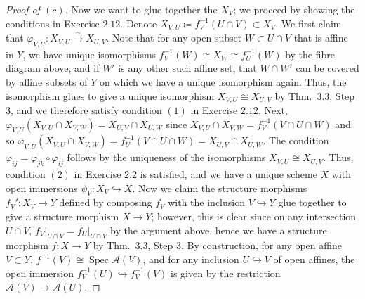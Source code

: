 \documentclass[10pt]{article}
\theoremstyle{definition}
\theoremstyle{remark}
\numberwithin{equation}{section}
\numberwithin{figure}{subsubsection}
\DeclareMathOperator{\Spec}{Spec}
\newcommand{\Aa}{\mathscr{A}}
\newcommand{\isoto}{\overset{\sim}{\to}}
\begin{document}
\begin{proof}[Proof of $(c)$]
  \par Now we want to glue together the $X_V$; we proceed by showing the conditions in Exercise $2.12$. Denote $X_{V,U} \coloneqq f_V^{-1}(U \cap V) \subset X_V$. We first claim that $\varphi_{V,U}\colon X_{V,U} \isoto X_{U,V}$. Note that for any open subset $W \subset U \cap V$ that is affine in $Y$, we have unique isomorphisms $f_V^{-1}(W) \cong X_W \cong f_U^{-1}(W)$ by the fibre diagram above, and if $W'$ is any other such affine set, that $W \cap W'$ can be covered by affine subsets of $Y$ on which we have a unique isomorphism again. Thus, the isomorphism glues to give a unique isomorphism $X_{V,U} \cong X_{U,V}$ by Thm.~3.3, Step 3, and we therefore satisfy condition $(1)$ in Exercise $2.12$. Next, $\varphi_{V,U}(X_{V,U} \cap X_{V,W}) = X_{U,V} \cap X_{U,W}$ since $X_{V,U} \cap X_{V,W} = f_V^{-1}(V \cap U \cap W)$ and so $\varphi_{V,U}(X_{V,U} \cap X_{V,W}) = f_U^{-1}(V \cap U \cap W) = X_{U,V} \cap X_{U,W}$. The condition $\varphi_{ij} = \varphi_{jk} \circ \varphi_{ij}$ follows by the uniqueness of the isomorphisms $X_{V,U} \cong X_{U,V}$. Thus, condition $(2)$ in Exercise $2.2$ is satisfied, and we have a unique scheme $X$ with open immersions $\psi_V\colon X_V \hookrightarrow X$. Now we claim the structure morphisms $f_V'\colon X_V \to Y$ defined by composing $f_V$ with the inclusion $V \hookrightarrow Y$ glue together to give a structure morphism $X \to Y$; however, this is clear since on any intersection $U \cap V$, $f_V\vert_{U \cap V} = f_U\vert_{U \cap V}$ by the argument above, hence we have a structure morphism $f\colon X \to Y$ by Thm.~3.3, Step 3. By construction, for any open affine $V \subset Y$, $f^{-1}(V) \cong \Spec \Aa(V)$, and for any inclusion $U \hookrightarrow V$ of open affines, the open immersion $f_V^{-1}(U) \hookrightarrow f_V^{-1}(V)$ is given by the restriction $\Aa(V) \to \Aa(U)$.
\end{proof}
\end{document}
